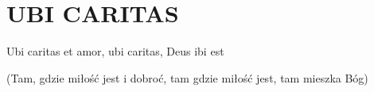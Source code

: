 \documentclass[../../../songbook.tex]{subfiles}
\begin{document}
\TabPositions{8cm} %
\section*{UBI CARITAS}
{}
\vspace{0.5cm}
Ubi caritas et amor,			 \newline	
ubi caritas, Deus ibi est		 \newline	

{\footnotesize
(Tam, gdzie miłość jest i dobroć, \newline
tam gdzie miłość jest, tam mieszka Bóg)
}
\end{document}
